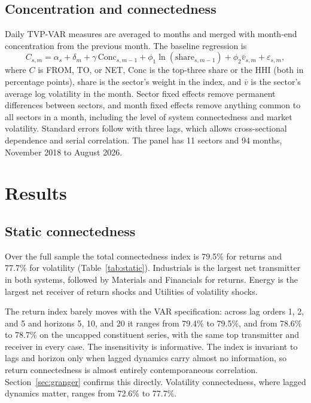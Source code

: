 \documentclass[11pt]{article}
\begin{document}
\subsection{Concentration and connectedness}

Daily TVP-VAR measures are averaged to months and merged with month-end concentration from the previous month. The baseline regression is
\begin{equation}
C_{s,m} = \alpha_s + \delta_m + \gamma\,\text{Conc}_{s,m-1} + \phi_1\ln(\text{share}_{s,m-1}) + \phi_2 \bar v_{s,m} + \varepsilon_{s,m},
\end{equation}
where $C$ is FROM, TO, or NET, Conc is the top-three share or the HHI (both in percentage points), share is the sector's weight in the index, and $\bar v$ is the sector's average log volatility in the month. Sector fixed effects remove permanent differences between sectors, and month fixed effects remove anything common to all sectors in a month, including the level of system connectedness and market volatility. Standard errors follow \citet{driscoll1998} with three lags, which allows cross-sectional dependence and serial correlation. The panel has 11 sectors and 94 months, November 2018 to August 2026.

\section{Results}\label{sec:results}

\subsection{Static connectedness}

Over the full sample the total connectedness index is 79.5\% for returns and 77.7\% for volatility (Table~\ref{tab:static}). Industrials is the largest net transmitter in both systems, followed by Materials and Financials for returns. Energy is the largest net receiver of return shocks and Utilities of volatility shocks.

The return index barely moves with the VAR specification: across lag orders 1, 2, and 5 and horizons 5, 10, and 20 it ranges from 79.4\% to 79.5\%, and from 78.6\% to 78.7\% on the uncapped constituent series, with the same top transmitter and receiver in every case. The insensitivity is informative. The index is invariant to lags and horizon only when lagged dynamics carry almost no information, so return connectedness is almost entirely contemporaneous correlation. Section~\ref{sec:granger} confirms this directly. Volatility connectedness, where lagged dynamics matter, ranges from 72.6\% to 77.7\%.
\end{document}
